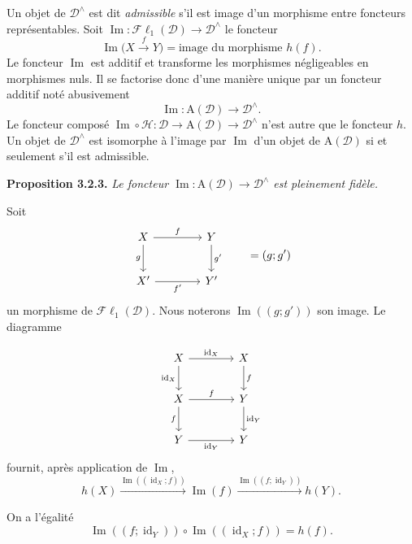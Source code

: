\clearpage
{}%
\begingroup\small
\setlength{\parskip}{0pt}\setlength{\emergencystretch}{1.5em}

Un objet de $\mathcal D^\wedge$ est dit \emph{admissible} s'il est image d'un
morphisme entre foncteurs représentables. Soit
$\operatorname{Im}\colon\mathcal{F}\ell_1(\mathcal D)\to\mathcal D^\wedge$
le foncteur
\[
\operatorname{Im}\bigl(X\xrightarrow fY\bigr)
=\text{image du morphisme }h(f).
\tag{3.2.2.1}
\]
Le foncteur $\operatorname{Im}$ est additif et transforme les morphismes
négligeables en morphismes nuls. Il se factorise donc d'une manière unique par
un foncteur additif noté abusivement
\[
\operatorname{Im}\colon\mathrm A(\mathcal D)\longrightarrow\mathcal D^\wedge.
\tag{3.2.2.2}
\]
Le foncteur composé
$\operatorname{Im}\circ\mathcal H\colon
\mathcal D\longrightarrow\mathrm A(\mathcal D)
\longrightarrow\mathcal D^\wedge$
n'est autre que le foncteur $h$. Un objet de
$\mathcal D^\wedge$ est isomorphe à l'image par $\operatorname{Im}$ d'un objet de
$\mathrm A(\mathcal D)$ si et seulement s'il est admissible.

\medskip\noindent\textbf{Proposition 3.2.3.}\quad
\textit{Le foncteur
$\operatorname{Im}\colon\mathrm A(\mathcal D)\to\mathcal D^\wedge$ est
pleinement fidèle.}

Soit
\[
\begin{tikzcd}[column sep=4em,row sep=2.4em]
X\arrow[r,"f"]\arrow[d,"g"']&Y\arrow[d,"g'"]\\
X'\arrow[r,"f'"']&Y'
\end{tikzcd}
\qquad=(g;g')
\]
un morphisme de $\mathcal{F}\ell_1(\mathcal D)$. Nous noterons
$\operatorname{Im}((g;g'))$ son image. Le diagramme

\[
\begin{tikzcd}[column sep=4em,row sep=2.2em]
X\arrow[r,"\operatorname{id}_X"]\arrow[d,"\operatorname{id}_X"']&X\arrow[d,"f"]\\
X\arrow[r,"f"]\arrow[d,"f"']&Y\arrow[d,"\operatorname{id}_Y"]\\
Y\arrow[r,"\operatorname{id}_Y"']&Y
\end{tikzcd}
\]
fournit, après application de $\operatorname{Im}$,
\[
h(X)\xrightarrow{\operatorname{Im}((\operatorname{id}_X;f))}
\operatorname{Im}(f)\xrightarrow{\operatorname{Im}((f;\operatorname{id}_Y))}h(Y).
\]

On a l'égalité
\[
\operatorname{Im}((f;\operatorname{id}_Y))\circ
\operatorname{Im}((\operatorname{id}_X;f))=h(f).
\tag{3.2.3.1}
\]
\endgroup
